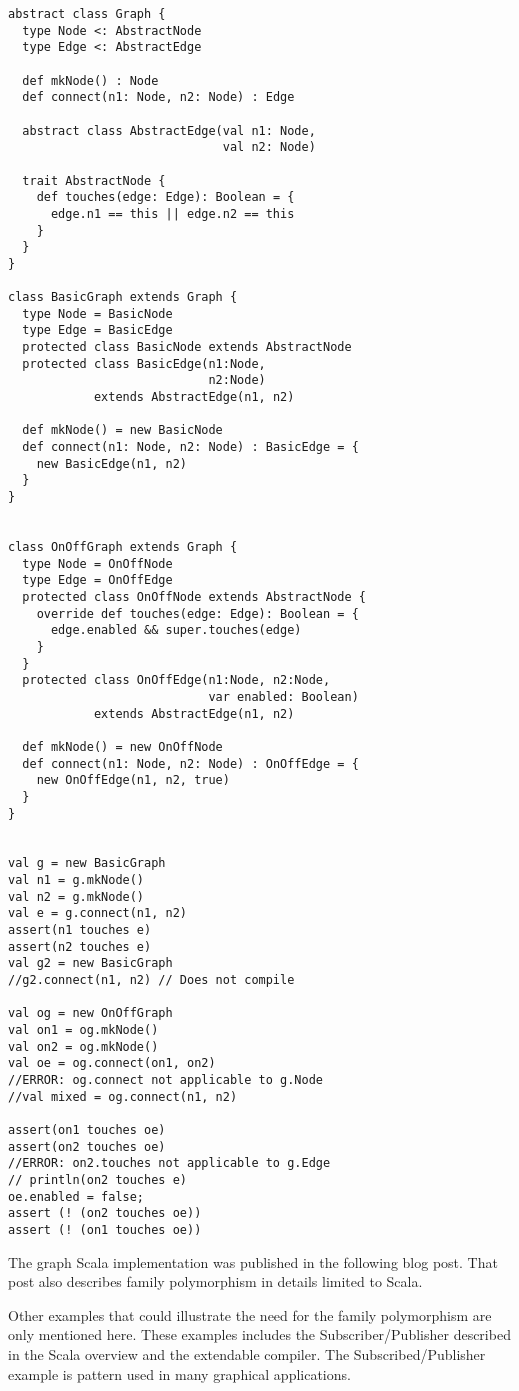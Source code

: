 \documentclass[a4paper, 10pt, conference ]{llncs}
\let\cite\parencite
\begin{document}
\begin{verbatim}
abstract class Graph {
  type Node <: AbstractNode
  type Edge <: AbstractEdge

  def mkNode() : Node
  def connect(n1: Node, n2: Node) : Edge

  abstract class AbstractEdge(val n1: Node,
                              val n2: Node)

  trait AbstractNode {
    def touches(edge: Edge): Boolean = {
      edge.n1 == this || edge.n2 == this
    }
  }
}

class BasicGraph extends Graph {
  type Node = BasicNode
  type Edge = BasicEdge
  protected class BasicNode extends AbstractNode
  protected class BasicEdge(n1:Node,
                            n2:Node)
            extends AbstractEdge(n1, n2)

  def mkNode() = new BasicNode
  def connect(n1: Node, n2: Node) : BasicEdge = {
    new BasicEdge(n1, n2)
  }
}


class OnOffGraph extends Graph {
  type Node = OnOffNode
  type Edge = OnOffEdge
  protected class OnOffNode extends AbstractNode {
    override def touches(edge: Edge): Boolean = {
      edge.enabled && super.touches(edge)
    }
  }
  protected class OnOffEdge(n1:Node, n2:Node,
                            var enabled: Boolean)
            extends AbstractEdge(n1, n2)

  def mkNode() = new OnOffNode
  def connect(n1: Node, n2: Node) : OnOffEdge = {
    new OnOffEdge(n1, n2, true)
  }
}


val g = new BasicGraph
val n1 = g.mkNode()
val n2 = g.mkNode()
val e = g.connect(n1, n2)
assert(n1 touches e)
assert(n2 touches e)
val g2 = new BasicGraph
//g2.connect(n1, n2) // Does not compile

val og = new OnOffGraph
val on1 = og.mkNode()
val on2 = og.mkNode()
val oe = og.connect(on1, on2)
//ERROR: og.connect not applicable to g.Node
//val mixed = og.connect(n1, n2)

assert(on1 touches oe)
assert(on2 touches oe)
//ERROR: on2.touches not applicable to g.Edge
// println(on2 touches e)
oe.enabled = false;
assert (! (on2 touches oe))
assert (! (on1 touches oe))
\end{verbatim}
The graph Scala implementation was published in the following blog post\cite{scala-graph-family-poly-example}. That post also describes family polymorphism in details limited to Scala.

Other examples that could illustrate the need for the family polymorphism are only mentioned here. These examples includes the Subscriber/Publisher described in the Scala overview\cite{odersky2004overview} and the extendable compiler\cite{odersky2005scalable}. The Subscribed/Publisher example is pattern used in many graphical applications.
\end{document}
